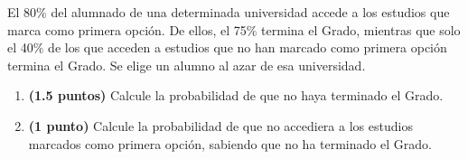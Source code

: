 
El 80\% del alumnado de una determinada universidad accede a los estudios que marca como primera opción. De ellos, el 75\% termina el Grado, mientras que solo el 40\% de los que acceden a estudios que no han marcado como primera opción termina el Grado. Se elige un alumno al azar de esa universidad.
\begin{enumerate}[label=\alph*)]
\item \textbf{(1.5 puntos)} Calcule la probabilidad de que no haya terminado el Grado.
\item \textbf{(1 punto)} Calcule la probabilidad de que no accediera a los estudios marcados como primera opción, sabiendo que no ha terminado el Grado.
\end{enumerate}
